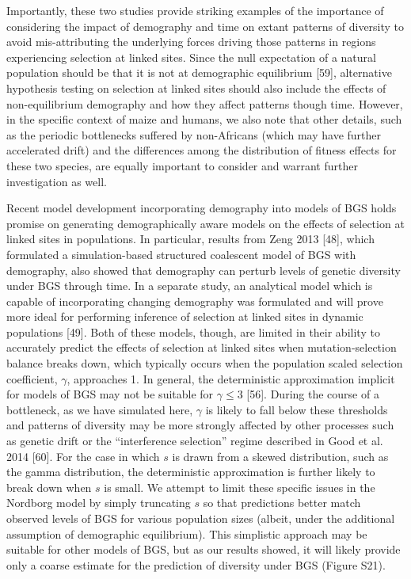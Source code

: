 \documentclass[9pt,twocolumn,twoside]{rilabRxiv}
\begin{document}
Importantly, these two studies provide striking examples of the
importance of considering the impact of demography and time on extant
patterns of diversity to avoid mis-attributing the underlying forces
driving those patterns in regions experiencing selection at linked
sites. Since the null expectation of a natural population should be that
it is not at demographic equilibrium [59], alternative hypothesis
testing on selection at linked sites should also include the effects of
non-equilibrium demography and how they affect patterns though time.
However, in the specific context of maize and humans, we also note that
other details, such as the periodic bottlenecks suffered by non-Africans
(which may have further accelerated drift) and the differences among the
distribution of fitness effects for these two species, are equally
important to consider and warrant further investigation as well.

Recent model development incorporating demography into models of BGS
holds promise on generating demographically aware models on the effects
of selection at linked sites in populations. In particular, results from
Zeng 2013 [48], which formulated a simulation-based structured
coalescent model of BGS with demography, also showed that demography can
perturb levels of genetic diversity under BGS through time. In a
separate study, an analytical model which is capable of incorporating
changing demography was formulated and will prove more ideal for
performing inference of selection at linked sites in dynamic populations
[49]. Both of these models, though, are limited in their ability to
accurately predict the effects of selection at linked sites when
mutation-selection balance breaks down, which typically occurs when the
population scaled selection coefficient, $\gamma$, approaches 1. In
general, the deterministic approximation implicit for models of BGS may
not be suitable for $\gamma \leq 3$ [56]. During the course of a
bottleneck, as we have simulated here, $\gamma$ is likely to fall below
these thresholds and patterns of diversity may be more strongly affected
by other processes such as genetic drift or the ``interference
selection'' regime described in Good et al. 2014 [60]. For the case
in which $s$ is drawn from a skewed distribution, such as the gamma
distribution, the deterministic approximation is further likely to break
down when $s$ is small. We attempt to limit these specific issues
in the Nordborg model by simply truncating $s$ so that predictions
better match observed levels of BGS for various population sizes
(albeit, under the additional assumption of demographic equilibrium).
This simplistic approach may be suitable for other models of BGS, but as
our results showed, it will likely provide only a coarse estimate for
the prediction of diversity under BGS (Figure S21).
\end{document}
